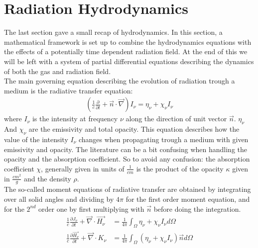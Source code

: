 \section{Radiation Hydrodynamics}
The last section gave a small recap of hydrodynamics. In this section, a mathematical framework is set up to combine the hydrodynamics equations with the effects of a potentially time dependent radiation field. At the end of this we will be left with a system of partial differential equations describing the dynamics of both the gas and radiation field.\\ 
The main governing equation describing the evolution of radiation trough a medium is the radiative transfer equation:
\begin{align}
\left( \frac{1}{c} \frac{\partial}{\partial t} + \vec{n} \cdot \vec{\nabla} \right) I_\nu = \eta_\nu + \chi_\nu I_\nu \label{eq: RTE}
\end{align}
where $I_\nu$ is the intensity at frequency $\nu$ along the direction of unit vector $\vec{n}$. $\eta_\nu$ And $\chi_\nu$ are the emissivity and total opacity. This equation describes how the value of the intensity $I_\nu$ changes when propagating trough a medium with given emissivity and opacity. The literature can be a bit confusing when handling the opacity and the absorption coefficient. So to avoid any confusion: the absorption coefficient $\chi$, generally given in units of $\frac{1}{cm}$ is the product of the opacity $\kappa$ given in $\frac{cm^2}{g}$ and the density $\rho$.\\

The so-called moment equations of radiative transfer are obtained by integrating over all solid angles and dividing by $4 \pi$ for the first order moment equation, and for the $2^{nd}$ order one by first multiplying with $\vec{n}$ before doing the integration.\\

\begin{align}
\frac{1}{c} \frac{\partial J_\nu}{\partial t} + \vec{\nabla} \cdot \vec{H_\nu} &= \frac{1}{4 \pi} \int_\Omega \eta_\nu + \chi_\nu I_\nu d\Omega \\
\frac{1}{c} \frac{\partial \vec{H_\nu}}{\partial t} + \vec{\nabla} \cdot K_\nu &= \frac{1}{4 \pi} \int_\Omega \left( \eta_\nu + \chi_\nu I_\nu\right) \vec{n} d\Omega
\end{align}

